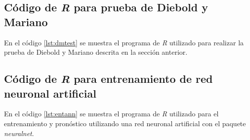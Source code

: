 

\newpage
\subsection*{Código de \textit{R} para prueba de Diebold y Mariano}

En el código \ref{lst:dmtest} se muestra el programa de \textit{R} utilizado para realizar la prueba de Diebold y Mariano descrita en la sección anterior.

\renewcommand{\baselinestretch}{1}

\renewcommand{\baselinestretch}{1.5}


\newpage
\subsection*{Código de \textit{R} para entrenamiento de red neuronal artificial}
En el código \ref{lst:entann} se muestra el programa de \textit{R} utilizado para el entrenamiento y pronóstico utilizando una red neuronal artificial con el paquete \textit{neuralnet}.

\renewcommand{\baselinestretch}{1}

\renewcommand{\baselinestretch}{1.5}
